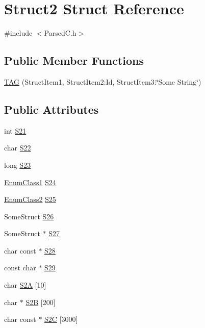 \hypertarget{structStruct2}{}\section{Struct2 Struct Reference}
\label{structStruct2}


{\ttfamily \#include $<$Parsed\+C.\+h$>$}

\subsection*{Public Member Functions}
\begin{DoxyCompactItemize}
\item 
\hyperlink{structStruct2_ae6896a66fa6c6f48393847aed8977521}{T\+AG} (Struct\+Item1, Struct\+Item2\+:\+Id, Struct\+Item3\+:\char`\"{}Some String\char`\"{})
\end{DoxyCompactItemize}
\subsection*{Public Attributes}
\begin{DoxyCompactItemize}
\item 
int \hyperlink{structStruct2_ab05c5f39fc72694124f782d656ded3a0}{S21}
\item 
char \hyperlink{structStruct2_af5f7e7a2c7b3372c2fa25f8e823af21e}{S22}
\item 
long \hyperlink{structStruct2_aa36023d5272e4916a86174b83f384abc}{S23}
\item 
\hyperlink{ParsedC_8h_a542930d5f2f117ff1e21206f2baa51c5}{Enum\+Class1} \hyperlink{structStruct2_afbace320147229ed3e2731608153c052}{S24}
\item 
\hyperlink{ParsedC_8h_a51df612b239afb50004d7a39b20a5745}{Enum\+Class2} \hyperlink{structStruct2_abcb5fd48eb7982bb4f6814c36e0071ec}{S25}
\item 
Some\+Struct \hyperlink{structStruct2_aa044d3679db18f7cb109c0e2b647e906}{S26}
\item 
Some\+Struct $\ast$ \hyperlink{structStruct2_a167bbe0c07423ac881f74ec233954dac}{S27}
\item 
char const  $\ast$ \hyperlink{structStruct2_a34ea25fad0eb64f1019b27878ec7a35a}{S28}
\item 
const char $\ast$ \hyperlink{structStruct2_ab7dbe557e331ce158aebc10448e33b60}{S29}
\item 
char \hyperlink{structStruct2_a890b0c7a9c7fe62acc080ef3df9ac424}{S2A} \mbox{[}10\mbox{]}
\item 
char $\ast$ \hyperlink{structStruct2_a2738d564696ad23d5cc3ea0c92726962}{S2B} \mbox{[}200\mbox{]}
\item 
char const  $\ast$ \hyperlink{structStruct2_a33d414ff28068cbcce9a5afcaad7920b}{S2C} \mbox{[}3000\mbox{]}
\end{DoxyCompactItemize}


